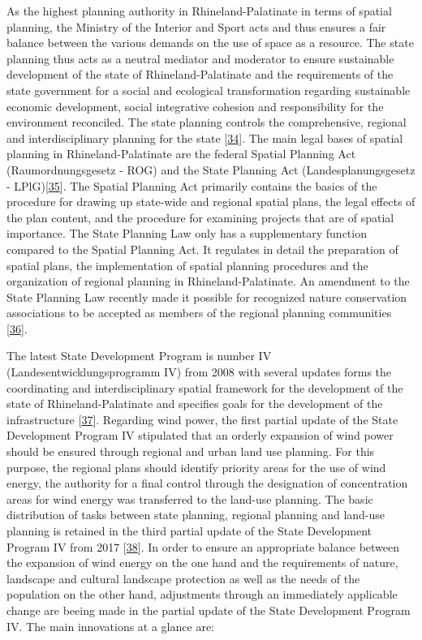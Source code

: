 \documentclass[a4paper,11pt]{article}
\begin{document}
As the highest planning authority in Rhineland-Palatinate in terms of spatial planning, the Ministry of the Interior and Sport acts and thus ensures a fair balance between the various demands on the use of space as a resource. The state planning thus acts as a neutral mediator and moderator to ensure sustainable development of the state of Rhineland-Palatinate and the requirements of the state government for a social and ecological transformation regarding sustainable economic development, social integrative cohesion and responsibility for the environment reconciled. The state planning controls the comprehensive, regional and interdisciplinary planning for the state {[}\protect\hyperlink{ref-MinisteriumdesInnernundfurSport.2021}{34}{]}. The main legal bases of spatial planning in Rhineland-Palatinate are the federal Spatial Planning Act (Raumordnungsgesetz - ROG) and the State Planning Act (Landesplanungsgesetz - LPlG){[}\protect\hyperlink{ref-BundesministeriumderJustizundfurVerbraucherschutz.2008}{35}{]}. The Spatial Planning Act primarily contains the basics of the procedure for drawing up state-wide and regional spatial plans, the legal effects of the plan content, and the procedure for examining projects that are of spatial importance. The State Planning Law only has a supplementary function compared to the Spatial Planning Act. It regulates in detail the preparation of spatial plans, the implementation of spatial planning procedures and the organization of regional planning in Rhineland-Palatinate. An amendment to the State Planning Law recently made it possible for recognized nature conservation associations to be accepted as members of the regional planning communities {[}\protect\hyperlink{ref-MinisteriumderJustizRheinlandPfalz.2003}{36}{]}.

The latest State Development Program is number IV (Landesentwicklungsprogramm IV) from 2008 with several updates forms the coordinating and interdisciplinary spatial framework for the development of the state of Rhineland-Palatinate and specifies goals for the development of the infrastructure {[}\protect\hyperlink{ref-MinisteriumdesInnernundfurSport.2008}{37}{]}. Regarding wind power, the first partial update of the State Development Program IV stipulated that an orderly expansion of wind power should be ensured through regional and urban land use planning. For this purpose, the regional plans should identify priority areas for the use of wind energy, the authority for a final control through the designation of concentration areas for wind energy was transferred to the land-use planning. The basic distribution of tasks between state planning, regional planning and land-use planning is retained in the third partial update of the State Development Program IV from 2017 {[}\protect\hyperlink{ref-MinisteriumdesInnernundfurSport.2017}{38}{]}. In order to ensure an appropriate balance between the expansion of wind energy on the one hand and the requirements of nature, landscape and cultural landscape protection as well as the needs of the population on the other hand, adjustments through an immediately applicable change are beeing made in the partial update of the State Development Program IV. The main innovations at a glance are:
\end{document}
